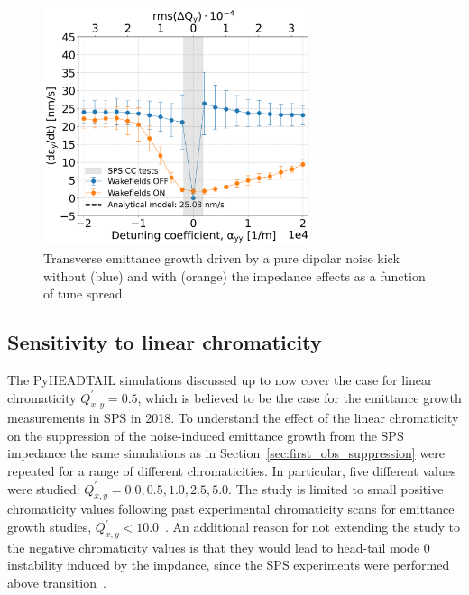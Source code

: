 \begin{figure}[!h] %
    \centering         
    \includegraphics[width=0.7\textwidth]{images/Ch7/deyRates_final_2018_PN_sps_270GeV_DipoleNoiseSQRT1e-8_y-plane_QpxQpy5e-1_6D_Nb5e5_intensity3e10_ayyScan_wakesON_vs_OFF_vs_TuneSpreadvsExpectedSPS.png}
        \caption{Transverse emittance growth driven by a pure dipolar noise kick without (blue) and with (orange) the impedance effects as a function of tune spread.}
        \label{fig:study_5_dipole_noise}
 \end{figure}

\subsection{Sensitivity to linear chromaticity}\label{subsec:chroma_scan}
The PyHEADTAIL simulations discussed up to now cover the case for linear chromaticity $Q^\prime_{x,y}=0.5$, which is believed to be the case for the emittance growth measurements in SPS in 2018. To understand the effect of the linear chromaticity on the suppression of the noise-induced emittance growth from the SPS impedance the same simulations as in Section~\ref{sec:first_obs_suppression} were repeated for a range of different chromaticities. In particular, five different values were studied: $Q^\prime_{x,y}=0.0, 0.5, 1.0, 2.5, 5.0$. The study is limited to small positive chromaticity values following past experimental chromaticity scans for emittance growth studies,  $Q^\prime_{x,y}< 10.0$~\cite{Antoniou:2649815, Calaga:1451286}. An additional reason for not extending the study to the negative chromaticity values is that they would lead to head-tail mode 0 instability induced by the impdance, since the SPS experiments were performed above transition~\cite{Chao:collective}.

